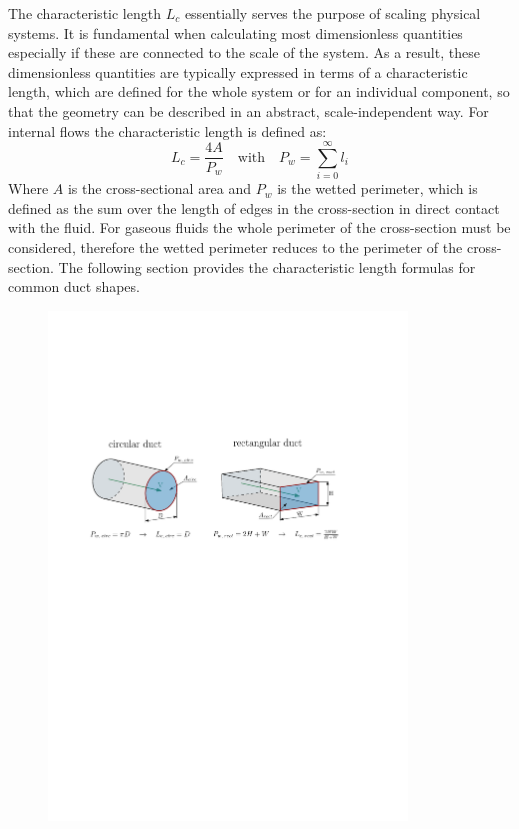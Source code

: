 The characteristic length $L_c$ essentially serves the purpose of scaling physical systems.
It is fundamental when calculating most dimensionless quantities especially if these are connected to the scale of the system.
As a result, these dimensionless quantities are typically expressed in terms of a characteristic length, which are defined for the whole system or for an individual component, so that the geometry can be described in an abstract, scale-independent way.
For internal flows the characteristic length is defined as:
\begin{equation}
	L_c=\frac{4A}{P_w} \quad \text{with} \quad P_w = \sum^{\infty}_{i=0} l_i
\end{equation}
Where $A$ is the cross-sectional area and $P_w$ is the wetted perimeter, which is defined as the sum over the length of edges in the cross-section in direct contact with the fluid.
For gaseous fluids the whole perimeter of the cross-section must be considered, therefore the wetted perimeter reduces to the perimeter of the cross-section.
The following section provides the characteristic length formulas for common duct shapes.
\cite{leishman_internal_2023}
\begin{figure}[H]
    \centering
    \includegraphics[width=0.85\textwidth]{src/02_foundations/fig_wetted-perimeter-nozzle-rect.pdf}
    \label{fig:wetted-rect-nozzle}
\end{figure}
